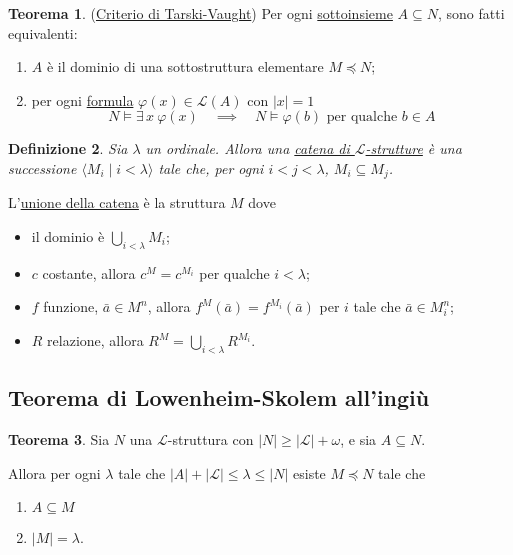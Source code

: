 \documentclass[10pt]{article}
\newcommand{\1}{\mathds{1}}
\theoremstyle{definition}%
\newtheorem{thm}{Teorema}[section]
\theoremstyle{plain}
\newtheorem{definizione}[thm]{Definizione}
\theoremstyle{remark}
\begin{document}
\begin{thm}
(\href{../../../../org/roam/20250212113245-criterio_di_tarski_vaught.org}{Criterio di Tarski-Vaught}) Per ogni \href{../../../../org/roam/20250131155822-operazioni_insiemistiche_tra_classi_mk.org}{sottoinsieme} \(A \subseteq N\), sono fatti equivalenti:
\begin{enumerate}
\item \(A\) è il dominio di una sottostruttura elementare \(M\preceq N\);
\item per ogni \href{../../../../org/roam/20250212102927-enunciato_con_parametri.org}{formula} \(\varphi(x) \in \mathcal{L}(A)\) con \(|x|=1\)
\begin{equation*}
 	N\vDash \exists\,x\ \varphi(x)\quad \implies\quad N\vDash \varphi(b)\text{ per qualche } b \in A
\end{equation*}
\end{enumerate}
\end{thm}

\begin{definizione}
Sia \(\lambda\) un ordinale. Allora una \uline{catena di \(\mathcal{L}\)-strutture} è una successione \(\langle M_{i}\mid i <\lambda\rangle\) tale che, per ogni \(i<j<\lambda\), \(M_{i} \subseteq M_{j}\).
\end{definizione}

L'\uline{unione della catena} è la struttura \(M\) dove
\begin{itemize}
\item il dominio è \(\bigcup_{i<\lambda} M_{i}\);
\item \(c\) costante, allora \(c^{M} =c^{M_{i}}\) per qualche \(i<\lambda\);
\item \(f\) funzione, \(\bar{a} \in M^{n}\), allora \(f^{M}(\bar{a}) = f^{M_{i}}(\bar{a})\) per \(i\) tale che \(\bar{a} \in M_{i}^{n}\);
\item \(R\) relazione, allora \(R^{M} = \bigcup_{i<\lambda} R^{M_{i}}\).
\end{itemize}
\subsection{Teorema di Lowenheim-Skolem all'ingiù}
\label{sec:org18b498c}

\begin{thm}
Sia \(N\) una \(\mathcal{L}\)-struttura con \(|N|\ge |\mathcal{L}|+\omega\), e sia \(A \subseteq N\).

Allora per ogni \(\lambda\) tale che \(|A|+|\mathcal{L}|\le \lambda \le |N|\) esiste \(M\preceq N\) tale che
\begin{enumerate}
\item \(A \subseteq M\)
\item \(|M|=\lambda\).
\end{enumerate}
\end{thm}
\end{document}
